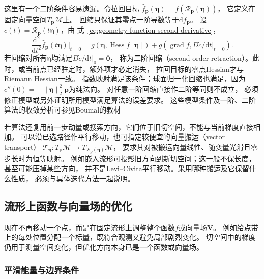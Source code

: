 这里有一个二阶条件容易遗漏。令拉回目标
$\widehat f_{\bm p}(\bm\eta)=f(\mathcal R_{\bm p}(\bm\eta))$，
它定义在固定向量空间$T_{\bm p}\mathcal M$上。
回缩只保证其零点一阶导数等于$\mathrm df_{\bm p}$。
设$c(t)=\mathcal R_{\bm p}(t\bm\eta)$，由
式~\eqref{eq:geometry-function-second-derivative}，
\begin{equation}
 \frac{\mathrm d^2}{\mathrm dt^2}\widehat f_{\bm p}(t\bm\eta)
 \bigg|_{t=0}
 =g(\bm\eta,\operatorname{Hess}f[\bm\eta])
  +g(\operatorname{grad}f,D\dot c/\mathrm dt|_{t=0}).
 \label{eq:geometry-retraction-pullback-hessian}
\end{equation}
若回缩对所有$\bm\eta$均满足$D\dot c/\mathrm dt|_0=\bm0$，
称为二阶回缩（second-order retraction）。此时，或当前点已经驻定时，额外项才必定消失，
拉回目标的零点Hessian才与Riemann Hessian一致。
指数映射满足该条件；球面归一化回缩也满足，因为
$c''(0)=-\lVert\bm\eta\rVert_2^2\bm p$为纯法向。
对任意一阶回缩直接作二阶等同则不成立，
必须修正模型或另外证明所用模型满足算法的误差要求。
这些模型条件及一阶、二阶算法的收敛分析可参见Boumal的教材

若算法还复用前一步动量或搜索方向，它们位于旧切空间，不能与当前梯度直接相加。
可以沿已选路径作平行移动，也可指定较便宜的向量搬运（vector transport）
$\mathcal T_{\bm\eta}:T_{\bm p}\mathcal M\to
T_{\mathcal R_{\bm p}(\bm\eta)}\mathcal M$，
要求其对被搬运向量线性、随变量光滑且零步长时为恒等映射。
例如嵌入流形可投影旧方向到新切空间；这一般不保长度，甚至可能压掉某些方向，
并不是Levi--Civita平行移动。采用哪种搬运及它保留什么性质，
必须与具体迭代方法一起说明。

\subsection{流形上函数与向量场的优化}
\label{sec:geometry-smoothness-geometric-operators}

现在不再移动一个点，而是在固定流形上调整整个函数$f$或向量场$\bm V$。
例如给点带上的每处位置分配一个标量，既符合观测又避免局部剧烈变化。
切空间中的梯度仍用于测量空间变化，但优化方向本身已是一个函数或向量场。

\subsubsection{平滑能量与边界条件}
\label{sec:geometry-smoothness-energy-boundary}


